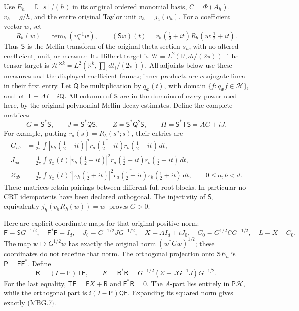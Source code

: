 Use \(E_h=\mathbb C[s]/(h)\) in its original ordered monomial basis,
\(C=\Phi(A_h)\), \(v_h=g/h\), and the entire original Taylor unit
\(\upsilon_h=j_h(v_h)\). For a coefficient vector \(w\), set
\[
 R_h(w)=\operatorname{rem}_h(\upsilon_h^{-1}w),\qquad
 (\mathsf S w)(t)=v_h(\tfrac12+it)R_h(w;\tfrac12+it).
 \tag{MBG.3}\label{eq:mbg-S}
\]
Thus \(\mathsf S\) is the Mellin transform of the original theta section
\(s_h\), with no altered coefficient, unit, or measure. Its Hilbert
target is \(\mathscr H=L^2(\mathbb R,dt/(2\pi))\). The tensor target
is \(\mathscr H^{\otimes k}=L^2(\mathbb R^k,\prod_i dt_i/(2\pi))\).
All adjoints below use these measures and the displayed coefficient
frames; inner products are conjugate linear in their first entry.
Let \(\mathsf Q\) be multiplication by \(q_\Phi(t)\), with domain
\(\{f:q_\Phi f\in\mathscr H\}\), and let
\(\mathsf T=A I+i\mathsf Q\). All columns of \(\mathsf S\) are in
the domains of every power used here, by the original polynomial
Mellin decay estimates. Define the complete matrices
\[
 G=\mathsf S^*\mathsf S,\qquad
 J=\mathsf S^*\mathsf Q\mathsf S,\qquad
 Z=\mathsf S^*\mathsf Q^2\mathsf S,\qquad
 H=\mathsf S^*\mathsf T\mathsf S=A G+iJ.
 \tag{MBG.4}\label{eq:mbg-moments}
\]
For example, putting \(r_a(s)=R_h(s^a;s)\), their entries are
\[
 \begin{split}
 G_{ab}&=\frac1{2\pi}\int
   |v_h(\tfrac12+it)|^2\overline{r_a(\tfrac12+it)}r_b(\tfrac12+it)\,dt,\\
 J_{ab}&=\frac1{2\pi}\int q_\Phi(t)
   |v_h(\tfrac12+it)|^2\overline{r_a(\tfrac12+it)}r_b(\tfrac12+it)\,dt,\\
 Z_{ab}&=\frac1{2\pi}\int q_\Phi(t)^2
   |v_h(\tfrac12+it)|^2\overline{r_a(\tfrac12+it)}r_b(\tfrac12+it)\,dt,
 \qquad 0\le a,b<d .
 \end{split}
 \tag{MBG.5}\label{eq:mbg-all-entries}
\]
These matrices retain pairings between different full root blocks.
In particular no CRT idempotents have been declared orthogonal.
The injectivity of \(\mathsf S\), equivalently \(j_h(v_hR_h(w))=w\),
proves \(G>0\).

Here are explicit coordinate maps for that original positive norm:
\[
 \mathsf F=\mathsf S G^{-1/2},\quad \mathsf F^*\mathsf F=I_d,\quad
 J_0=G^{-1/2}JG^{-1/2},\quad X=A I_d+iJ_0,\quad
 C_0=G^{1/2}CG^{-1/2},\quad L=X-C_0.
 \tag{MBG.6}\label{eq:mbg-coordinates}
\]
The map \(w\mapsto G^{1/2}w\) has exactly the original norm
\((w^*Gw)^{1/2}\); these coordinates do not redefine that norm.
The orthogonal projection onto \(\mathsf S E_h\) is
\(\mathsf P=\mathsf F\mathsf F^*\). Define
\[
 \mathsf R=(I-\mathsf P)\mathsf T\mathsf F,\qquad
 K=\mathsf R^*\mathsf R
  =G^{-1/2}(Z-JG^{-1}J)G^{-1/2}.
 \tag{MBG.7}\label{eq:mbg-covariance}
\]
For the last equality, \(\mathsf T\mathsf F=\mathsf F X+\mathsf R\)
and \(\mathsf F^*\mathsf R=0\). The \(A\)-part lies entirely in
\(\mathsf P\mathscr H\), while the orthogonal part is
\(i(I-\mathsf P)\mathsf Q\mathsf F\). Expanding its squared norm
gives exactly (MBG.7).

